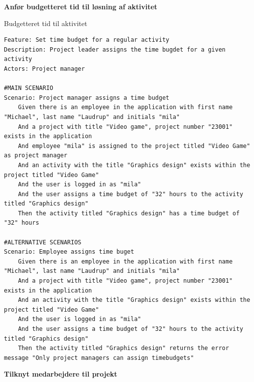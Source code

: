 \textbf{Anfør budgetteret tid til løsning af aktivitet}
\begin{listing}[H]
    \centering
    \caption{Budgetteret tid til aktivitet}\label{lst:budget_time}
    \begin{verbatim}
Feature: Set time budget for a regular activity
Description: Project leader assigns the time bugdet for a given activity
Actors: Project manager

#MAIN SCENARIO
Scenario: Project manager assigns a time budget
    Given there is an employee in the application with first name "Michael", last name "Laudrup" and initials "mila"
    And a project with title "Video game", project number "23001" exists in the application
    And employee "mila" is assigned to the project titled "Video Game" as project manager
    And an activity with the title "Graphics design" exists within the project titled "Video Game"
    And the user is logged in as "mila"
    And the user assigns a time budget of "32" hours to the activity titled "Graphics design"
    Then the activity titled "Graphics design" has a time budget of "32" hours

#ALTERNATIVE SCENARIOS
Scenario: Employee assigns time buget
    Given there is an employee in the application with first name "Michael", last name "Laudrup" and initials "mila"
    And a project with title "Video game", project number "23001" exists in the application
    And an activity with the title "Graphics design" exists within the project titled "Video Game"
    And the user is logged in as "mila"
    And the user assigns a time budget of "32" hours to the activity titled "Graphics design"
    Then the activity titled "Graphics design" returns the error message "Only project managers can assign timebudgets"
    \end{verbatim}
\end{listing}
\textbf{Tilknyt medarbejdere til projekt}
